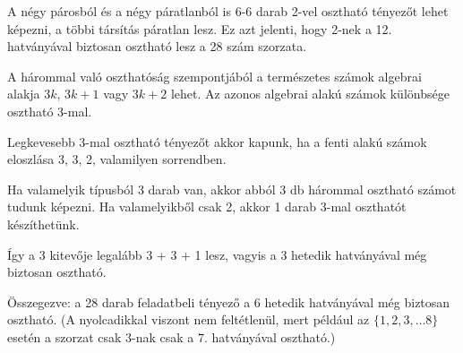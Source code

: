 \documentclass[a4paper,10pt]{article}
\begin{document}
A négy párosból és a négy páratlanból is 6-6 darab 2-vel osztható tényezőt lehet képezni, a többi társítás páratlan lesz. Ez azt jelenti, hogy 2-nek a 12. hatványával biztosan osztható lesz
a 28 szám szorzata.

A hárommal való oszthatóság szempontjából a természetes számok algebrai alakja $3k$, $3k +1$ vagy $3k + 2$ lehet. Az azonos algebrai alakú számok különbsége osztható 3-mal.

Legkevesebb 3-mal osztható tényezőt akkor kapunk, ha a fenti alakú számok eloszlása 3, 3, 2, valamilyen sorrendben.

Ha valamelyik típusból 3 darab van, akkor abból 3 db hárommal osztható számot tudunk képezni. Ha valamelyikből csak 2, akkor 1 darab 3-mal oszthatót készíthetünk.

Így a 3 kitevője legalább 3 + 3 + 1 lesz, vagyis a 3 hetedik hatványával még biztosan osztható.

Összegezve: a 28 darab feladatbeli tényező a 6 hetedik hatványával még biztosan osztható. (A nyolcadikkal viszont nem feltétlenül, mert például az $\{1,2,3,\ldots 8\}$ esetén a szorzat csak 3-nak csak a 7. hatványával osztható.)
\end{document}
